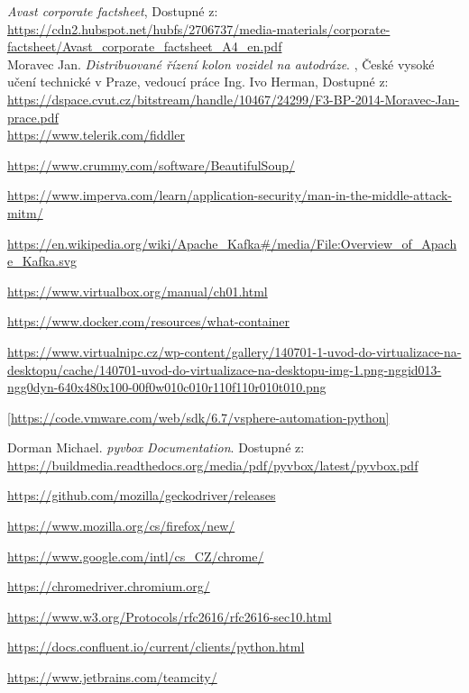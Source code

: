 \documentclass[thesis=M,czech,hidelinks]{FITthesis}[2013/05/06]
\begin{document}


\begin{thebibliography}{9}

    \textit{Avast corporate factsheet}, Dostupné z: \\       \url{https://cdn2.hubspot.net/hubfs/2706737/media-materials/corporate-factsheet/Avast_corporate_factsheet_A4_en.pdf} \\
       	
       	Moravec Jan. \textit{Distribuované řízení kolon vozidel na autodráze}. , České vysoké učení technické v Praze, vedoucí práce Ing. Ivo Herman, Dostupné z: \\    \url{https://dspace.cvut.cz/bitstream/handle/10467/24299/F3-BP-2014-Moravec-Jan-prace.pdf} \\
    
    \url{https://www.telerik.com/fiddler}
    
    \url{https://www.crummy.com/software/BeautifulSoup/} 	

    
    \url{https://www.imperva.com/learn/application-security/man-in-the-middle-attack-mitm/}


	\url{https://en.wikipedia.org/wiki/Apache_Kafka#/media/File:Overview_of_Apache_Kafka.svg}
	
	\url{https://www.virtualbox.org/manual/ch01.html}
	
	\url{https://www.docker.com/resources/what-container}
	
	\url{https://www.virtualnipc.cz/wp-content/gallery/140701-1-uvod-do-virtualizace-na-desktopu/cache/140701-uvod-do-virtualizace-na-desktopu-img-1.png-nggid013-ngg0dyn-640x480x100-00f0w010c010r110f110r010t010.png}
	
	\url{[https://code.vmware.com/web/sdk/6.7/vsphere-automation-python]}
	
	Dorman Michael. \textit{pyvbox Documentation}.  Dostupné z: \\
	\url{https://buildmedia.readthedocs.org/media/pdf/pyvbox/latest/pyvbox.pdf}
	
	\url{https://github.com/mozilla/geckodriver/releases}
	
	\url{https://www.mozilla.org/cs/firefox/new/}
	
	\url{https://www.google.com/intl/cs_CZ/chrome/}
	
	\url{https://chromedriver.chromium.org/}
	
	\url{https://www.w3.org/Protocols/rfc2616/rfc2616-sec10.html}
	
	\url{https://docs.confluent.io/current/clients/python.html}
	
	\url{https://www.jetbrains.com/teamcity/}
	
\end{thebibliography}
\end{document}
